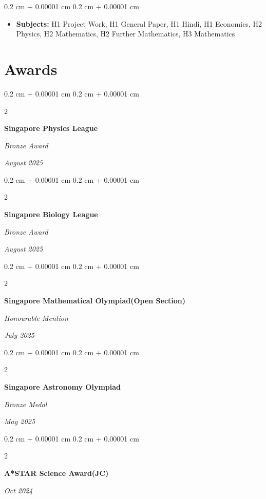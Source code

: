 \documentclass[10pt, letterpaper]{article}
\newenvironment{highlights}{
    \begin{itemize}[
        topsep=0.10 cm,
        parsep=0.10 cm,
        partopsep=0pt,
        itemsep=0pt,
        leftmargin=0.4 cm + 10pt
    ]
}{
    \end{itemize}
} %
\newenvironment{onecolentry}{
    \begin{adjustwidth}{
        0.2 cm + 0.00001 cm
    }{
        0.2 cm + 0.00001 cm
    }
}{
    \end{adjustwidth}
} %
\newenvironment{twocolentry}[2][]{
    \onecolentry
    \def\secondColumn{#2}
    \setcolumnwidth{\fill, 4.5 cm}
    \begin{paracol}{2}
}{
    \switchcolumn \raggedleft \secondColumn
    \end{paracol}
    \endonecolentry
} %
\begin{document}
        \vspace{0.10 cm}
        \begin{onecolentry}
            \begin{highlights}
                \item \textbf{Subjects:} H1 Project Work, H1 General Paper, H1 Hindi, H1 Economics, H2 Physics, H2 Mathematics, H2 Further Mathematics, H3 Mathematics
            \end{highlights}
        \end{onecolentry}




    
    



    
    \section{Awards}
         \begin{twocolentry}{

            
        \textit{August 2025}}
            \textbf{Singapore Physics League}

            \textit{Bronze Award}
        \end{twocolentry}
     \begin{twocolentry}{

            
        \textit{August 2025}}
            \textbf{Singapore Biology League}

            \textit{Bronze Award}
        \end{twocolentry}
     \begin{twocolentry}{

            
        \textit{July 2025}}
            \textbf{Singapore Mathematical Olympiad(Open Section)}

            \textit{Honourable Mention}
        \end{twocolentry}

         \begin{twocolentry}{
            
            
        \textit{May 2025}}
            \textbf{Singapore Astronomy Olympiad}

            \textit{Bronze Medal}
        \end{twocolentry}


         \begin{twocolentry}{
            
            
        \textit{Oct 2024}}
            \textbf{A*STAR Science Award(JC)}

        \end{twocolentry}
\end{document}
